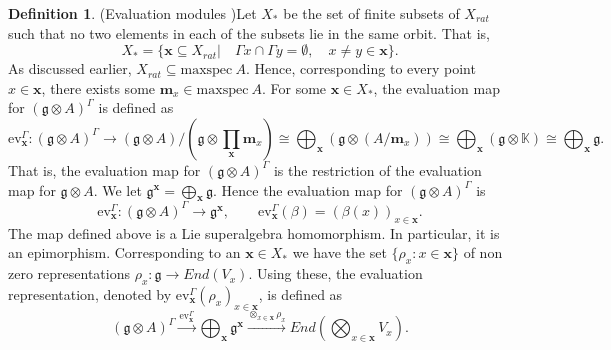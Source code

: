 \documentclass[11pt]{amsart}
\theoremstyle{plain}
\theoremstyle{definition}
\newtheorem{defn}[thm]{Definition}
\newcommand{\g}{\mathfrak{g}}
\begin{document}
\begin{defn} (Evaluation modules \cite{Sav14})\label{def:11}
Let $X_{*}$ \label{pg:7} be the set of finite subsets of $X_{rat}$ such that no two elements in each of the subsets lie in the same orbit. That is, 
\begin{equation*}
    X_{*}=\{\mathbf{x}\subseteq X_{rat}|\quad\Gamma x\cap\Gamma y=\emptyset,\quad x\neq y\in\mathbf{x}\}.
\end{equation*}
As discussed earlier, $X_{rat}\subseteq\mbox{maxspec}\ A$. Hence, corresponding to every point $x\in\mathbf{x}$, there exists some $\textbf{m}_{x}\in\mbox{maxspec}\ A$. For some $\mathbf{x}\in X_{*}$, the evaluation map for $(\g\otimes A)^{\Gamma}$ is defined as
\begin{equation*}
    \mbox{ev}_{\mathbf{x}}^{\Gamma}:(\g\otimes A)^{\Gamma}\rightarrow(\g\otimes A)/(\g\otimes \prod_{\mathbf{x}}\textbf{m}_{x})\cong\bigoplus_{\mathbf{x}}(\g\otimes(A/\textbf{m}_{x}))\cong\bigoplus_{\mathbf{x}}(\g\otimes\mathbb{K})\cong\bigoplus_{\mathbf{x}}\g.
\end{equation*}
That is, the evaluation map for $(\g\otimes A)^{\Gamma}$ is the restriction of the evaluation map for $\g\otimes A$. We let $\g^{\mathbf{x}}=\bigoplus_{\mathbf{x}}\g$. Hence the evaluation map for $(\g\otimes A)^{\Gamma}$ is 
\begin{equation*}
    \mbox{ev}_{\mathbf{x}}^{\Gamma}:(\g\otimes A)^{\Gamma}\rightarrow\g^{\mathbf{x}},\quad\quad \mbox{ev}_{\mathbf{x}}^{\Gamma}(\beta)=(\beta(x))_{x\in\mathbf{x}}.
\end{equation*}
The map defined above is a Lie superalgebra homomorphism. In particular, it is an epimorphism. Corresponding to an $\mathbf{x}\in X_{*}$ we have the set $\{\rho_{x}:x\in\mathbf{x}\}$ of non zero representations $\rho_{x}:\g\rightarrow End(V_{x})$. Using these, the evaluation representation, denoted by $\mbox{ev}_{\mathbf{x}}^{\Gamma}(\rho_{x})_{x\in\mathbf{x}}$, is defined as 
\begin{equation*}
    (\g\otimes A)^{\Gamma}\xrightarrow{\mbox{ev}_{\mathbf{x}}^{\Gamma}}\bigoplus_{\mathbf{x}}\g^{\mathbf{x}}\xrightarrow{\otimes _{x\in\mathbf{x}}\rho_{x}} End\left(\bigotimes_{x\in\mathbf{x}}V_{x}\right).
\end{equation*}
    
\end{defn}
\end{document}
